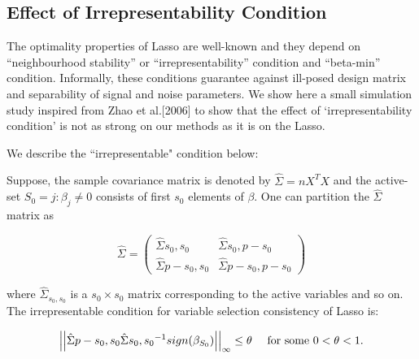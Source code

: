 \documentclass[ba]{imsart}
\def\sql{$\sqrt{\text{Lasso}}$}
\begin{document}
%

\subsection{Effect of Irrepresentability Condition}

The optimality properties of Lasso are well-known and they depend on ``neighbourhood stability'' or ``irrepresentability'' condition and ``beta-min'' condition. Informally, these conditions guarantee against ill-posed design matrix and separability of signal and noise parameters. We show here a small simulation study inspired from Zhao et al.[2006] to show that the effect of `irrepresentability condition' is not as strong on our methods as it is on the Lasso.


We describe the ``irrepresentable" condition below:\par Suppose, the sample covariance matrix is denoted by $\hat{\Sigma} = nX^T X$ and the active-set $S_0 = { j : \beta_j \neq 0}$ consists of first $s_0$ elements of $\beta$. One can partition the $\hat{\Sigma}$ matrix as

$$ \hat{\Sigma} = \left(\begin{array}{cc}
\hat{\Sigma}{s_0,s_0} & \hat{\Sigma}{s_0,p-s_0} \\ \hat{\Sigma}{p-s_0,s_0} & \hat{\Sigma}{p-s_0,p-s_0} \end{array} \right) $$

where $\hat{\Sigma}_{s_0,s_0}$ is a $s_0\times s_0$ matrix corresponding to the active variables and so on. The irrepresentable condition for variable selection consistency of Lasso is:

$$ \left|\left|\hat{\Sigma}{p-s_0,s_0} \hat{\Sigma}{s_0,s_0}^{-1} sign(\beta_{S_0})\right|\right|_{\infty} \leq \theta \quad \mbox{ for some } 0 < \theta < 1 .$$
\end{document}
